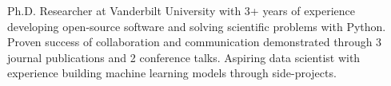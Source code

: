 
\begin{cvparagraph}
    Ph.D. Researcher at Vanderbilt University with 3+ years of experience
    developing open-source software and solving
    scientific problems with Python.  Proven success of collaboration and
    communication demonstrated through 3 journal publications and 2 conference
    talks.  Aspiring data
    scientist with experience building machine learning models through
    side-projects.

\end{cvparagraph}
